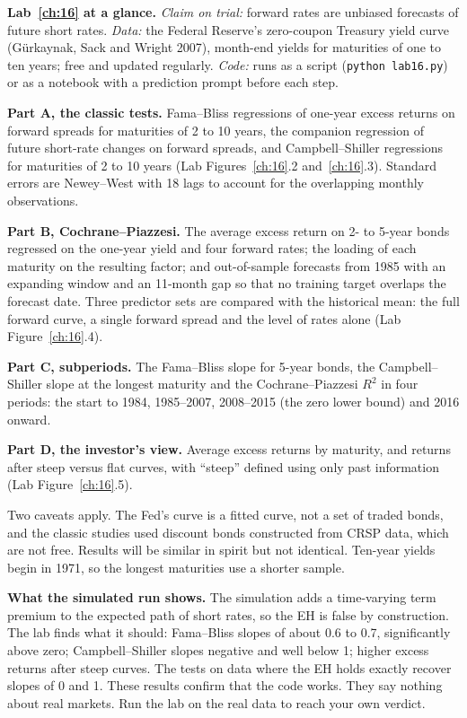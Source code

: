 \begin{callout}
\textbf{Lab~\ref{ch:16} at a glance.} \emph{Claim on trial:} forward rates are unbiased forecasts of future short rates. \emph{Data:} the Federal Reserve's zero-coupon Treasury yield curve (G\"urkaynak, Sack and Wright 2007), month-end yields for maturities of one to ten years; free and updated regularly. \emph{Code:} runs as a script (\texttt{python lab16.py}) or as a notebook with a prediction prompt before each step.
\end{callout}

\textbf{Part A, the classic tests.} Fama--Bliss regressions of one-year excess returns on forward spreads for maturities of 2 to 10 years, the companion regression of future short-rate changes on forward spreads, and Campbell--Shiller regressions for maturities of 2 to 10 years (Lab Figures~\ref{ch:16}.2 and~\ref{ch:16}.3). Standard errors are Newey--West with 18 lags to account for the overlapping monthly observations.

\textbf{Part B, Cochrane--Piazzesi.} The average excess return on 2- to 5-year bonds regressed on the one-year yield and four forward rates; the loading of each maturity on the resulting factor; and out-of-sample forecasts from 1985 with an expanding window and an 11-month gap so that no training target overlaps the forecast date. Three predictor sets are compared with the historical mean: the full forward curve, a single forward spread and the level of rates alone (Lab Figure~\ref{ch:16}.4).

\textbf{Part C, subperiods.} The Fama--Bliss slope for 5-year bonds, the Campbell--Shiller slope at the longest maturity and the Cochrane--Piazzesi $R^2$ in four periods: the start to 1984, 1985--2007, 2008--2015 (the zero lower bound) and 2016 onward.

\textbf{Part D, the investor's view.} Average excess returns by maturity, and returns after steep versus flat curves, with ``steep'' defined using only past information (Lab Figure~\ref{ch:16}.5).

Two caveats apply. The Fed's curve is a fitted curve, not a set of traded bonds, and the classic studies used discount bonds constructed from CRSP data, which are not free. Results will be similar in spirit but not identical. Ten-year yields begin in 1971, so the longest maturities use a shorter sample.

\textbf{What the simulated run shows.} The simulation adds a time-varying term premium to the expected path of short rates, so the EH is false by construction. The lab finds what it should: Fama--Bliss slopes of about 0.6 to 0.7, significantly above zero; Campbell--Shiller slopes negative and well below 1; higher excess returns after steep curves. The tests on data where the EH holds exactly recover slopes of 0 and 1. These results confirm that the code works. They say nothing about real markets. Run the lab on the real data to reach your own verdict.

